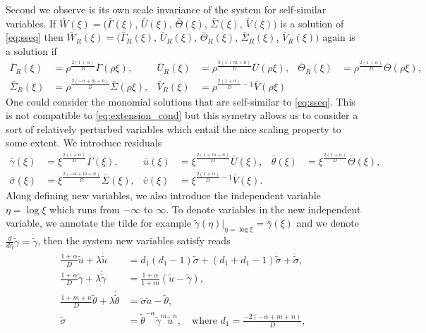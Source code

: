 \documentclass[a4paper,11pt]{article}
\def\blue{\color{blue}}
\def\bG{{\bar{\Gamma}}}
\def\bV{{\bar{V}}}
\def\bTh{{\bar{\Theta}}}
\def\bS{{\bar{\Sigma}}}
\def\bU{{\bar{U}}}
\def\bg{{\bar{\gamma}}}
\def\bv{{\bar{v}}}
\def\bth{{\bar{\theta}}}
\def\bs{{\bar{\sigma}}}
\def\bu{{\bar{u}}}
\def\tg{{\tilde{\gamma}}}
\def\tth{{\tilde{\theta}}}
\def\ts{{\tilde{\sigma}}}
\def\tu{{\tilde{u}}}
\theoremstyle{remark}
\begin{document}
Second we observe is its own scale invariance of the system for self-similar variables. If $\bar{W}(\xi)=\big(\bG(\xi)$, $\bU(\xi)$, $\bTh(\xi)$, $\bS(\xi)$, $\bV(\xi)\big)$ is a solution of \eqref{eq:sseq} then $\bar{W}_R(\xi)=\big(\bG _R(\xi)$, $\bU_R(\xi)$, $\bTh_R(\xi)$, $\bS_R(\xi)$, $\bV_R(\xi)\big)$ again is a solution if
{\blue
\begin{align*}
\bG _R(\xi)&=\rho^ \frac{2(1+ \alpha)}{D}\bG(\rho\xi), & \bU _R(\xi) &= \rho^ \frac{2(1+ m+n)}{D}\bU(\rho\xi), &
\bTh _R(\xi)&=\rho^ \frac{2(1+ \alpha)}{D}\bTh(\rho\xi), \\
\bS _R(\xi)&=\rho^ \frac{2(-\alpha+m+n)}{D}\bS(\rho\xi), & \bV _R(\xi) &=\rho^ {\frac{2(1+ \alpha)}{D}-1}\bV(\rho\xi)
\end{align*}
}
One could consider the monomial solutions that are self-similar to \eqref{eq:sseq}. This is not compatible to \eqref{eq:extension_cond} but this symetry allows us to consider a sort of relatively perturbed variables which entail the nice scaling property to some extent. We introduce residuals
\begin{align*}
\bg(\xi) &= \xi^ \frac{2(1+ \alpha)}{D}\bG(\xi), & \bu(\xi) &= \xi^ \frac{2(1+ m+n)}{D}\bU(\xi), &
\bth(\xi)&=\xi^ \frac{2(1+ \alpha)}{D}\bTh(\xi), \\
\bs(\xi)&=\xi^ \frac{2(-\alpha+m+n)}{D}\bS(\xi), & \bv(\xi) &=\xi^ {\frac{2(1+ \alpha)}{D}-1}\bV(\xi).
\end{align*}
Along defining new variables, we also introduce the independent variable $\eta = \log\xi$ which runs from $-\infty$ to $\infty$. To denote variables in the new independent variable, we annotate the tilde for example $\tg(\eta)|_{\eta=\log\xi}=\bg(\xi)$ and we denote $\frac{d}{d\eta} \tg = \dot\tg$, then the system new variables satisfy reads
\begin{equation} \label{eq:tildesys}
\begin{aligned}
\frac{1+ \alpha}{D} \tu + \lambda \dot\tu &= d_1(d_1-1)\ts + (d_1+d_1-1)\dot\ts + \ddot\ts,\\
\frac{1+ \alpha}{D} \tg + \lambda \dot\tg &= \frac{1 + \alpha}{1+m}( \tu - \tg ),\\
\frac{1+ m+n}{D} \tth + \lambda \dot\tth &= \ts\tu-\tth,\\
\ts &=\tth^{- \alpha} \tg ^m \tu ^n, \quad \text{where $d_1=\frac{-2(- \alpha +m+n)}{D}$},
\end{aligned}
\end{equation}
\end{document}
